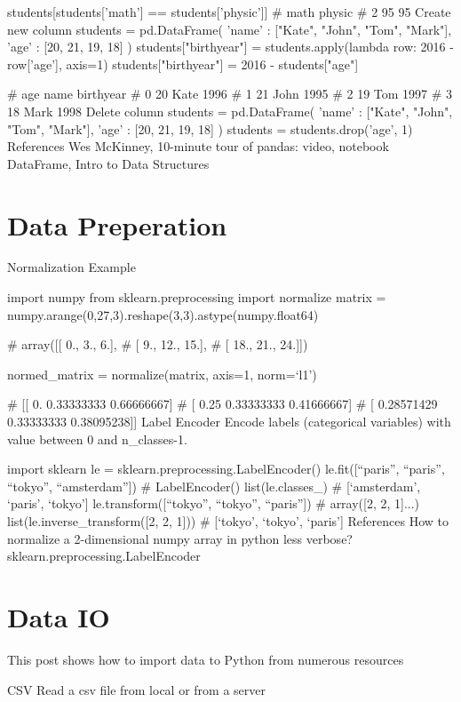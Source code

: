 students[students['math'] == students['physic']]
#    math  physic
# 2    95      95
Create new column
students = pd.DataFrame({
  'name' : ["Kate", "John", "Tom", "Mark"],
  'age' : [20, 21, 19, 18]
})
students["birthyear"] = students.apply(lambda row: 2016 - row['age'], axis=1)
students["birthyear"] = 2016 - students["age"]

#       age  name  birthyear
#    0   20  Kate       1996
#    1   21  John       1995
#    2   19   Tom       1997
#    3   18  Mark       1998
Delete column
students = pd.DataFrame({
  'name' : ["Kate", "John", "Tom", "Mark"],
  'age' : [20, 21, 19, 18]
})
students = students.drop('age', 1)
References
Wes McKinney, 10-minute tour of pandas: video, notebook
DataFrame, Intro to Data Structures

\section{Data Preperation}

Normalization
Example

import numpy
from sklearn.preprocessing import normalize
matrix = numpy.arange(0,27,3).reshape(3,3).astype(numpy.float64)

# array([[  0.,   3.,   6.],
#   [  9.,  12.,  15.],
#   [ 18.,  21.,  24.]])

normed_matrix = normalize(matrix, axis=1, norm=‘l1’)

# [[ 0.          0.33333333  0.66666667]
# [ 0.25        0.33333333  0.41666667]
# [ 0.28571429  0.33333333  0.38095238]]
Label Encoder
Encode labels (categorical variables) with value between 0 and n_classes-1.

import sklearn
le = sklearn.preprocessing.LabelEncoder()
le.fit([“paris”, “paris”, “tokyo”, “amsterdam”])
# LabelEncoder()
list(le.classes_)
# [‘amsterdam’, ‘paris’, ‘tokyo’]
le.transform([“tokyo”, “tokyo”, “paris”])
# array([2, 2, 1]...)
list(le.inverse_transform([2, 2, 1]))
# [‘tokyo’, ‘tokyo’, ‘paris’]
References
How to normalize a 2-dimensional numpy array in python less verbose?
sklearn.preprocessing.LabelEncoder

\section{Data IO}

This post shows how to import data to Python from numerous resources

CSV
Read a csv file from local or from a server

